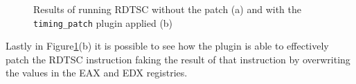 \begin{figure}%
    \centering
    \caption{Results of running RDTSC without the patch (a) and with the \lstinline{timing_patch} plugin applied (b)}%
    \label{fig:rdtsc1}%
\end{figure}

Lastly in Figure\ref{fig:rdtsc1}(b) it is possible to see how the plugin is able to effectively patch the RDTSC instruction faking the result of that instruction by overwriting the values in the EAX and EDX registries. 


